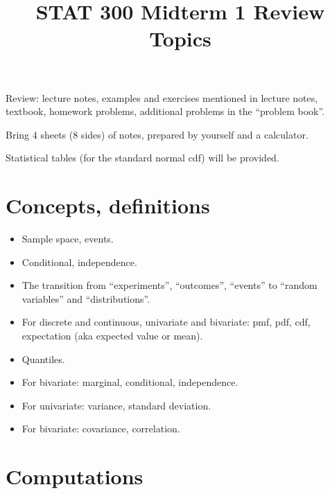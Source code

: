 \documentclass[12pt]{article}
\begin{document}
\title{STAT 300 Midterm 1 Review Topics}
\maketitle

Review: lecture notes, examples and exercises mentioned in lecture
notes, textbook, homework problems, additional problems in the ``problem
book''.

Bring 4 sheets (8 sides) of notes, prepared by yourself and
a calculator.

Statistical tables (for the standard normal cdf) will be provided.


\section{Concepts, definitions}

\begin{itemize}
\item Sample space, events.
\item Conditional, independence.
\item The transition from ``experiments'', ``outcomes'', ``events'' to
    ``random variables'' and ``distributions''.
\item For discrete and continuous, univariate and bivariate:
    pmf, pdf, cdf, expectation (aka expected value or mean).
\item Quantiles.
\item For bivariate: marginal, conditional, independence.
\item For univariate: variance, standard deviation.
\item For bivariate: covariance, correlation.
\end{itemize}

\section{Computations}
\end{document}
